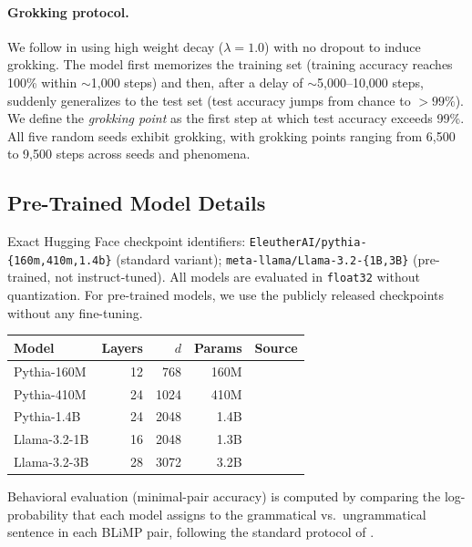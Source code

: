 \documentclass[11pt]{article}
\begin{document}
\paragraph{Grokking protocol.}
We follow \citet{DBLP:journals/corr/abs-2201-02177} in using high weight decay ($\lambda{=}1.0$) with no dropout to induce grokking.
The model first memorizes the training set (training accuracy reaches 100\% within $\sim$1{,}000 steps) and then, after a delay of $\sim$5{,}000--10{,}000 steps, suddenly generalizes to the test set (test accuracy jumps from chance to $> 99\%$).
We define the \emph{grokking point} as the first step at which test accuracy exceeds 99\%.
All five random seeds exhibit grokking, with grokking points ranging from 6{,}500 to 9{,}500 steps across seeds and phenomena.

\subsection{Pre-Trained Model Details}
\label{app:pretrained}

Exact Hugging Face checkpoint identifiers: \texttt{EleutherAI/pythia-\{160m,\allowbreak{}410m,\allowbreak{}1.4b\}} (standard variant); \texttt{meta-llama/\allowbreak{}Llama-3.2-\{1B,3B\}} (pre-trained, not instruct-tuned).
All models are evaluated in \texttt{float32} without quantization.
For pre-trained models, we use the publicly released checkpoints without any fine-tuning.

\begin{table}[t]
\centering\footnotesize
\begin{tabular}{@{}lrrrr@{}}
\toprule
\textbf{Model} & \textbf{Layers} & $d$ & \textbf{Params} & \textbf{Source} \\
\midrule
Pythia-160M & 12 & 768 & 160M & \citep{DBLP:conf/icml/BidermanSABOHKP23} \\
Pythia-410M & 24 & 1024 & 410M & \citep{DBLP:conf/icml/BidermanSABOHKP23} \\
Pythia-1.4B & 24 & 2048 & 1.4B & \citep{DBLP:conf/icml/BidermanSABOHKP23} \\
Llama-3.2-1B & 16 & 2048 & 1.3B & \citep{DBLP:journals/corr/abs-2407-21783} \\
Llama-3.2-3B & 28 & 3072 & 3.2B & \citep{DBLP:journals/corr/abs-2407-21783} \\
\bottomrule
\end{tabular}
\end{table}

Behavioral evaluation (minimal-pair accuracy) is computed by comparing the log-probability that each model assigns to the grammatical vs.\ ungrammatical sentence in each BLiMP pair, following the standard protocol of \citet{warstadt2020blimp}.
\end{document}
